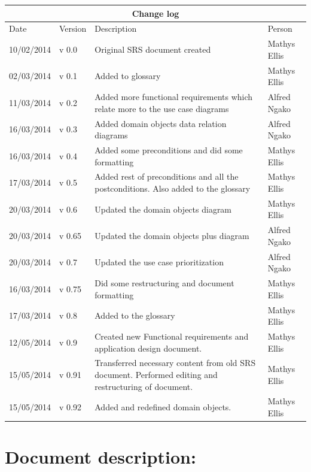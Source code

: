 \documentclass[12pt]{article}
\begin{document}
\begin{center}
\begin{tabular}{|l|p{1.4cm}|p{8cm}|p{2.8cm}|}
\hline
\multicolumn{4}{|c|}{\bf Change log} \\
\hline
 Date & Version & Description &  Person \\
\hline
10/02/2014 & v 0.0 & Original SRS document created & Mathys Ellis \\
\hline
02/03/2014 & v 0.1 & Added to glossary & Mathys Ellis \\
\hline
11/03/2014 & v 0.2 & Added more functional requirements which relate more to the use case diagrams & Alfred Ngako \\
\hline
16/03/2014 & v 0.3 & Added domain objects data relation diagrams & Alfred Ngako \\
\hline
16/03/2014 & v 0.4 & Added some preconditions and did some formatting & Mathys Ellis \\
\hline
17/03/2014 & v 0.5 & Added rest of preconditions and all the postconditions. Also added to the glossary & Mathys Ellis \\
\hline
20/03/2014 & v 0.6 & Updated the domain objects diagram  & Mathys Ellis \\
\hline
20/03/2014 & v 0.65 & Updated the domain objects plus diagram  & Alfred Ngako \\
\hline
20/03/2014 & v 0.7 & Updated the use case prioritization  & Alfred Ngako \\
\hline
16/03/2014 & v 0.75 & Did some restructuring and document formatting & Mathys Ellis \\
\hline
17/03/2014 & v 0.8 & Added to the glossary & Mathys Ellis \\
\hline
12/05/2014 & v 0.9 & Created new Functional requirements and application design document. & Mathys Ellis \\
\hline
15/05/2014 & v 0.91 & Transferred necessary content from old SRS document. Performed editing and restructuring of document. & Mathys Ellis \\
\hline
15/05/2014 & v 0.92 & Added and redefined domain objects. & Mathys Ellis \\
\hline

\end{tabular}
\end{center}
\newpage
\tableofcontents

\listoffigures
\newpage
\section{Document description:}
\end{document}

